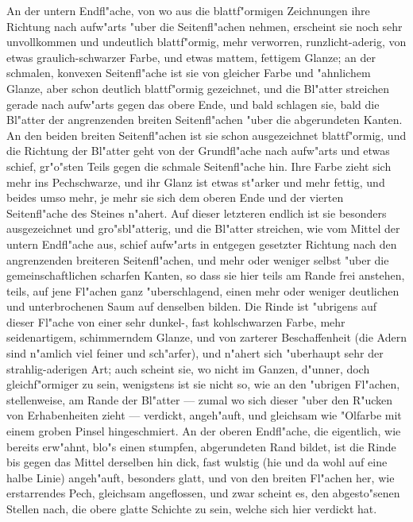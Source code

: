 \documentclass[a4paper, 11pt, oneside, german]{article}
\begin{document}
An der untern Endfl"ache, von wo aus die blattf"ormigen Zeichnungen ihre Richtung nach aufw"arts "uber die Seitenfl"achen nehmen, erscheint sie noch sehr unvollkommen und undeutlich blattf"ormig, mehr verworren, runzlicht-aderig, von etwas graulich-schwarzer Farbe, und etwas mattem, fettigem Glanze; an der schmalen, konvexen Seitenfl"ache ist sie von gleicher Farbe und "ahnlichem Glanze, aber schon deutlich blattf"ormig gezeichnet, und die Bl"atter streichen gerade nach aufw"arts gegen das obere Ende, und bald schlagen sie, bald die Bl"atter der angrenzenden breiten Seitenfl"achen "uber die abgerundeten Kanten. An den beiden breiten Seitenfl"achen ist sie schon ausgezeichnet blattf"ormig, und die Richtung der Bl"atter geht von der Grundfl"ache nach aufw"arts und etwas schief, gr"o"sten Teils gegen die schmale Seitenfl"ache hin. Ihre Farbe zieht sich mehr ins Pechschwarze, und ihr Glanz ist etwas st"arker und mehr fettig, und beides umso mehr, je mehr sie sich dem oberen Ende und der vierten Seitenfl"ache des Steines n"ahert. Auf dieser letzteren endlich ist sie besonders ausgezeichnet und gro"sbl"atterig, und die Bl"atter streichen, wie vom Mittel der untern Endfl"ache aus, schief aufw"arts in entgegen gesetzter Richtung nach den angrenzenden breiteren Seitenfl"achen, und mehr oder weniger selbst "uber die gemeinschaftlichen scharfen Kanten, so dass sie hier teils am Rande frei anstehen, teils, auf jene Fl"achen ganz "uberschlagend, einen mehr oder weniger deutlichen und unterbrochenen Saum auf denselben bilden. Die Rinde ist "ubrigens auf dieser Fl"ache von einer sehr dunkel-, fast kohlschwarzen Farbe, mehr seidenartigem, schimmerndem Glanze, und von zarterer Beschaffenheit (die Adern sind n"amlich viel feiner und sch"arfer), und n"ahert sich "uberhaupt sehr der strahlig-aderigen Art; auch scheint sie, wo nicht im Ganzen, d"unner, doch gleichf"ormiger zu sein, wenigstens ist sie nicht so, wie an den "ubrigen Fl"achen, stellenweise, am Rande der Bl"atter --- zumal wo sich dieser "uber den R"ucken von Erhabenheiten zieht --- verdickt, angeh"auft, und gleichsam wie "Olfarbe mit einem groben Pinsel hingeschmiert. An der oberen Endfl"ache, die eigentlich, wie bereits erw"ahnt, blo"s einen stumpfen, abgerundeten Rand bildet, ist die Rinde bis gegen das Mittel derselben hin dick, fast wulstig (hie und da wohl auf eine halbe Linie) angeh"auft, besonders glatt, und von den breiten Fl"achen her, wie erstarrendes Pech, gleichsam angeflossen, und zwar scheint es, den abgesto"senen Stellen nach, die obere glatte Schichte zu sein, welche sich hier verdickt hat.
\end{document}
